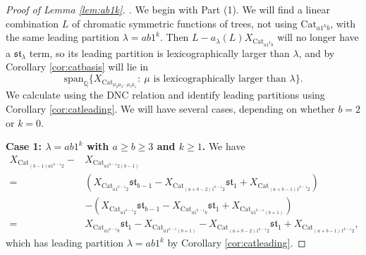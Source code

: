 \documentclass[10pt,a4paper]{amsart}
\begin{document}
\begin{proof}[Proof of Lemma \ref{lem:ab1k}. ]
We begin with Part (1). We will find a linear combination $L$ of chromatic symmetric functions of trees, not using $\text{Cat}_{a1^kb}$, with the same leading partition $\lambda=ab1^k$. Then $L-a_\lambda(L)X_{\text{Cat}_{a1^kb}}$ will no longer have a $\mathfrak{st}_\lambda$ term, so its leading partition is lexicographically larger than $\lambda$, and by Corollary \ref{cor:catbasis} will lie in \begin{equation}\text{span}_{\mathbb Q}\{X_{\text{Cat}_{\mu_2\mu_3\cdots\mu_\ell\mu_1}}: \ \mu\text{ is lexicographically larger than }\lambda\}.\end{equation}
We calculate using the DNC relation and identify leading partitions using Corollary \ref{cor:catleading}. We will have several cases, depending on whether $b=2$ or $k=0$.

\textbf{Case 1: $\lambda=ab1^k$ with $a\geq b\geq 3$ and $k\geq 1$. } We have
\begin{align*}
X_{\text{Cat}_{(b-1)a1^{k-1}2}}-&X_{\text{Cat}_{a1^{k-1}2(b-1)}}\\=&(X_{\text{Cat}_{a1^{k-1}2}}\mathfrak{st}_{b-1}-X_{\text{Cat}_{(a+b-2)1^{k-1}2}}\mathfrak{st}_1+X_{\text{Cat}_{(a+b-1)1^{k-1}2}})\\&-(X_{\text{Cat}_{a1^{k-1}2}}\mathfrak{st}_{b-1}-X_{\text{Cat}_{a1^{k-1}b}}\mathfrak{st}_1+X_{\text{Cat}_{a1^{k-1}(b+1)}})\\=&X_{\text{Cat}_{a1^{k-1}b}}\mathfrak{st}_1-X_{\text{Cat}_{a1^{k-1}(b+1)}}-X_{\text{Cat}_{(a+b-2)1^{k-1}2}}\mathfrak{st}_1+X_{\text{Cat}_{(a+b-1)1^{k-1}2}},
\end{align*}
which has leading partition $\lambda=ab1^k$ by Corollary \ref{cor:catleading}.


\end{proof}
\end{document}

